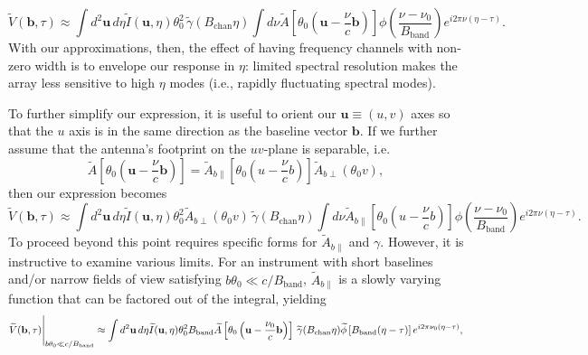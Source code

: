 \documentclass[twocolumn,aps,prd,nofootinbib,showpacs]{revtex4-1}
\begin{document}
\begin{widetext}
\begin{equation}
\label{eq:genVtilde}
\widetilde{V} (\mathbf{b}, \tau) \approx  \int d^2\mathbf{u} \, d\eta \widetilde{I} (\mathbf{u}, \eta) \theta_0^2  \,\widetilde{\gamma}(B_\textrm{chan} \eta) \int d\nu  \widetilde{A} \left[ \theta_0 \left( \mathbf{u} - \frac{\nu}{c} \mathbf{b} \right) \right] \phi \left( \frac{\nu - \nu_0}{B_\textrm{band}} \right) e^{i 2 \pi \nu (\eta - \tau)}.
\end{equation}
With our approximations, then, the effect of having frequency channels with non-zero width is to envelope our response in $\eta$: limited spectral resolution makes the array less sensitive to high $\eta$ modes (i.e., rapidly fluctuating spectral modes).

To further simplify our expression, it is useful to orient our $\mathbf{u} \equiv (u,v)$ axes so that the $u$ axis is in the same direction as the baseline vector $\mathbf{b}$.  If we further assume that the antenna's footprint on the $uv$-plane is separable, i.e.
\begin{equation}
\label{eq:SepPrimaryBeam}
\widetilde{A} \left[ \theta_0 \left( \mathbf{u} - \frac{\nu}{c} \mathbf{b} \right) \right] = \widetilde{A}_{b\parallel} \left[ \theta_0 \left( u - \frac{\nu}{c} b \right) \right] \widetilde{A}_{b\perp} (\theta_0 v),
\end{equation}
then our expression becomes
\begin{equation}
\label{eq:vIntegratedGenVtilde}
\widetilde{V} (\mathbf{b}, \tau) \approx  \int d^2\mathbf{u} \, d\eta \widetilde{I} (\mathbf{u}, \eta) \theta_0^2  \widetilde{A}_{b\perp} (\theta_0 v) \,\widetilde{\gamma}(B_\textrm{chan} \eta) \int d\nu \widetilde{A}_{b\parallel} \left[ \theta_0 \left( u - \frac{\nu}{c} b \right) \right] \phi \left( \frac{\nu - \nu_0}{B_\textrm{band}} \right) e^{i 2 \pi \nu (\eta - \tau)}.
\end{equation}
To proceed beyond this point requires specific forms for $\widetilde{A}_{b\parallel}$ and $\gamma$.  However, it is instructive to examine various limits.  For an instrument with short baselines and/or narrow fields of view satisfying $b\theta_0 \ll c/B_\textrm{band} $, $\widetilde{A}_{b\parallel}$ is a slowly varying function that can be factored out of the integral, yielding
\begin{equation}
\label{eq:shortBlVtilde}
\widetilde{V} (\mathbf{b}, \tau) \Bigg{|}_{b\theta_0 \ll c/B_\textrm{band}} \approx \int d^2\mathbf{u} \, d\eta \widetilde{I} (\mathbf{u}, \eta) \theta_0^2 B_\textrm{band} \widetilde{A} \left[ \theta_0 \left( \mathbf{u} - \frac{\nu_0}{c} \mathbf{b} \right) \right] \,\widetilde{\gamma}(B_\textrm{chan} \eta)  \widetilde{\phi} \left[ B_\textrm{band} (\eta - \tau) \right] e^{i 2\pi \nu_0 (\eta - \tau)},

\end{equation}
\end{widetext}
\end{document}
